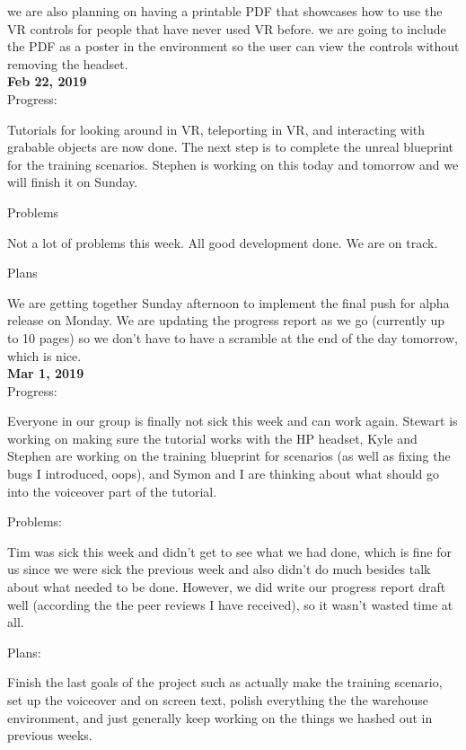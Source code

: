 we are also planning on having a printable PDF that showcases how to use the VR controls for people that have never used VR before. we are going to include the PDF as a poster in the environment so the user can view the controls without removing the headset.\\

\textbf{Feb 22, 2019}\\
Progress:

Tutorials for looking around in VR, teleporting in VR, and interacting with grabable objects are now done. The next step is to complete the unreal blueprint for the training scenarios. Stephen is working on this today and tomorrow and we will finish it on Sunday.

Problems

Not a lot of problems this week. All good development done. We are on track.

Plans

We are getting together Sunday afternoon to implement the final push for alpha release on Monday. We are updating the progress report as we go (currently up to 10 pages) so we don't have to have a scramble at the end of the day tomorrow, which is nice.\\

\textbf{Mar 1, 2019}\\
Progress:

Everyone in our group is finally not sick this week and can work again. Stewart is working on making sure the tutorial works with the HP headset, Kyle and Stephen are working on the training blueprint for scenarios (as well as fixing the bugs I introduced, oops), and Symon and I are thinking about what should go into the voiceover part of the tutorial.

Problems:

Tim was sick this week and didn't get to see what we had done, which is fine for us since we were sick the previous week and also didn't do much besides talk about what needed to be done. However, we did write our progress report draft well (according the the peer reviews I have received), so it wasn't wasted time at all.

Plans:

Finish the last goals of the project such as actually make the training scenario, set up the voiceover and on screen text, polish everything the the warehouse environment, and just generally keep working on the things we hashed out in previous weeks.\\

